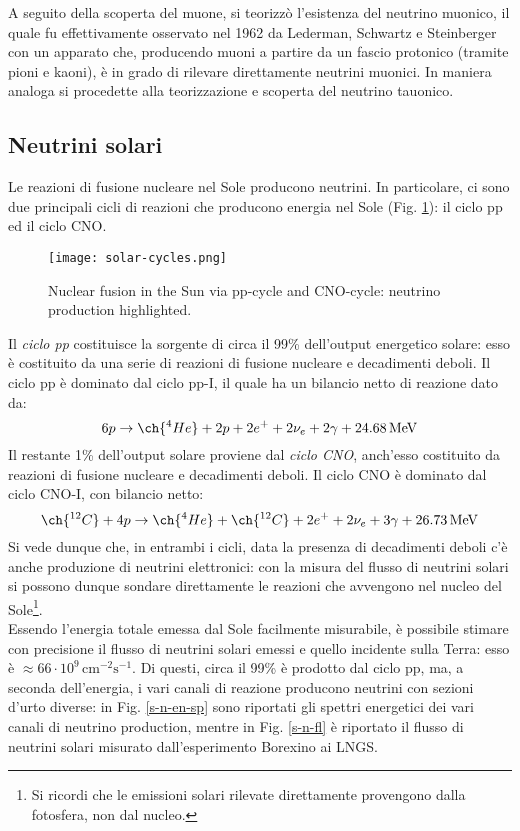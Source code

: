 A seguito della scoperta del muone, si teorizzò l'esistenza del neutrino muonico, il quale fu effettivamente osservato nel 1962 da Lederman, Schwartz e Steinberger con un apparato che, producendo muoni a partire da un fascio protonico (tramite pioni e kaoni), è in grado di rilevare direttamente neutrini muonici. In maniera analoga si procedette alla teorizzazione e scoperta del neutrino tauonico.

\subsection{Neutrini solari}

Le reazioni di fusione nucleare nel Sole producono neutrini. In particolare, ci sono due principali cicli di reazioni che producono energia nel Sole (Fig. \ref{sol-cyc}): il ciclo pp ed il ciclo CNO.

\begin{figure}[!b]
	\centering
	\texttt{[image: solar-cycles.png]}
	\caption{Nuclear fusion in the Sun via pp-cycle and CNO-cycle: neutrino production highlighted.}
	\label{sol-cyc}
\end{figure}

Il \textit{ciclo pp} costituisce la sorgente di circa il 99\% dell'output energetico solare: esso è costituito da una serie di reazioni di fusione nucleare e decadimenti deboli. Il ciclo pp è dominato dal ciclo pp-I, il quale ha un bilancio netto di reazione dato da:
\begin{equation*}
	6p \rightarrow \ch{^4He} + 2p + 2e^+ + 2\nu_e + 2\gamma + 24.68\mev
\end{equation*}
Il restante 1\% dell'output solare proviene dal \textit{ciclo CNO}, anch'esso costituito da reazioni di fusione nucleare e decadimenti deboli. Il ciclo CNO è dominato dal ciclo CNO-I, con bilancio netto:
\begin{equation*}
	\ch{^{12}C} + 4p \rightarrow \ch{^4He} + \ch{^{12}C} + 2e^+ + 2\nu_e + 3\gamma + 26.73\mev
\end{equation*}
Si vede dunque che, in entrambi i cicli, data la presenza di decadimenti deboli c'è anche produzione di neutrini elettronici: con la misura del flusso di neutrini solari si possono dunque sondare direttamente le reazioni che avvengono nel nucleo del Sole\footnote{Si ricordi che le emissioni solari rilevate direttamente provengono dalla fotosfera, non dal nucleo.}.\\
Essendo l'energia totale emessa dal Sole facilmente misurabile, è possibile stimare con precisione il flusso di neutrini solari emessi e quello incidente sulla Terra: esso è $ \approx 66\cdot10^9 \,\text{cm}^{-2}\text{s}^{-1} $. Di questi, circa il 99\% è prodotto dal ciclo pp, ma, a seconda dell'energia, i vari canali di reazione producono neutrini con sezioni d'urto diverse: in Fig. \ref{s-n-en-sp} sono riportati gli spettri energetici dei vari canali di neutrino production, mentre in Fig. \ref{s-n-fl} è riportato il flusso di neutrini solari misurato dall'esperimento Borexino ai LNGS.

